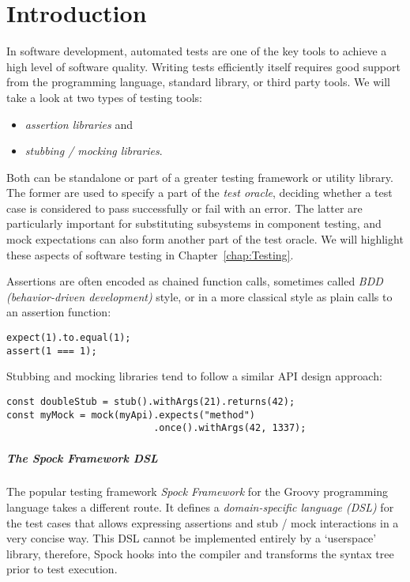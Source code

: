 \chapter{Introduction}
In software development, automated tests are one of the key tools
to achieve a high level of software quality.
Writing tests efficiently itself requires good support
from the programming language, standard library, or third party tools.
We will take a look at two types of testing tools:
\begin{itemize}
  \item \textit{assertion libraries} and
  \item \textit{stubbing / mocking libraries}.
\end{itemize}
Both can be standalone or part of a greater testing framework or utility library.
The former are used to specify a part of the \textit{test oracle},
deciding whether a test case is considered to pass successfully or fail with an error.
The latter are particularly important for substituting subsystems in component testing,
and mock expectations can also form another part of the test oracle.
We will highlight these aspects of software testing in Chapter~\ref{chap:Testing}.

Assertions are often encoded as chained function calls,
sometimes called \textit{BDD (behavior-driven development)} style,
or in a more classical style as plain calls to an assertion function:
\autocite{ChaiBddDoc}\autocite{ChaiTddDoc}
\begin{verbatim}
expect(1).to.equal(1);
assert(1 === 1);
\end{verbatim}
Stubbing and mocking libraries tend to follow a similar API design approach:
\autocite{SinonStubDoc}\autocite{SinonMockDoc}
\begin{verbatim}
const doubleStub = stub().withArgs(21).returns(42);
const myMock = mock(myApi).expects("method")
                          .once().withArgs(42, 1337);
\end{verbatim}

\paragraph{The Spock Framework DSL}
The popular testing framework \textit{Spock Framework}
for the Groovy programming language takes a different route.
It defines a \textit{domain-specific language (DSL)} for the test cases
that allows expressing assertions and stub / mock interactions in a very concise way.
This DSL cannot be implemented entirely by a `userspace' library, therefore,
Spock hooks into the compiler and transforms the syntax tree prior to test execution.

